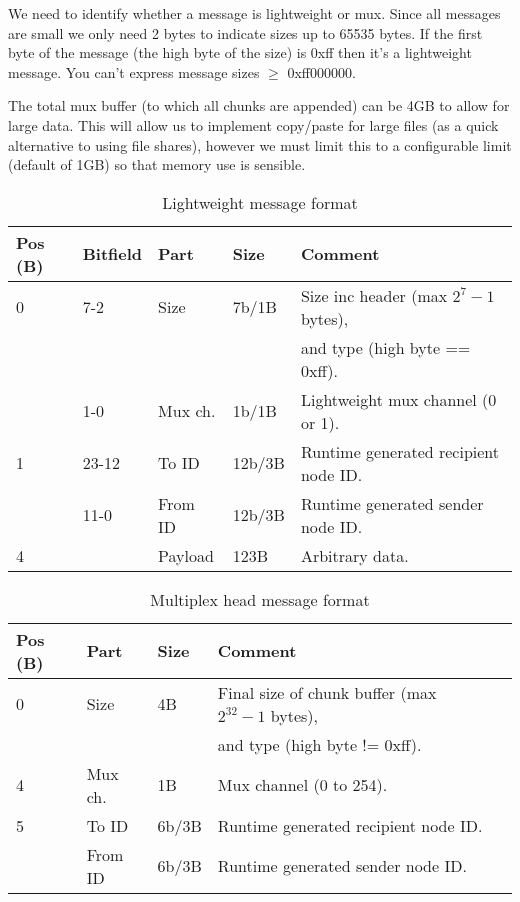 We need to identify whether a message is lightweight or mux. Since all
messages are small we only need 2 bytes to indicate sizes up to 65535 bytes.
If the first byte of the message (the high byte of the size) is 0xff then 
it's a lightweight message. You can't express message sizes $\geq$ 0xff000000.

The total mux buffer (to which all chunks are appended) can be 4GB to allow 
for large data. This will allow us to implement copy/paste for large files
(as a quick alternative to using file shares), however we must limit this
to a configurable limit (default of 1GB) so that memory use is sensible.

\begin{table}[ht!]
  \begin{tabular}{|l|l|l|l|l|}
    \hline
    \textbf{Pos (B)} &
    \textbf{Bitfield} &
    \textbf{Part} &
    \textbf{Size} &
    \textbf{Comment} \\
    \hline
    0 & 7-2 & Size & 7b/1B & Size inc header (max $2^7-1$ bytes), \\
      &     &      &       & and type (high byte == 0xff). \\
      & 1-0 & Mux ch. & 1b/1B & Lightweight mux channel (0 or 1). \\
    1 & 23-12 & To ID & 12b/3B & Runtime generated recipient node ID. \\
      & 11-0 & From ID & 12b/3B & Runtime generated sender node ID. \\
    4 & & Payload & 123B & Arbitrary data. \\
    \hline
  \end{tabular}
  \caption{Lightweight message format}
  \label{tab:lightMessage}
\end{table}

\begin{table}[ht!]
  \begin{tabular}{|l|l|l|l|l|}
    \hline
    \textbf{Pos (B)} &
    \textbf{Part} &
    \textbf{Size} &
    \textbf{Comment} \\
    \hline
    0 & Size & 4B & Final size of chunk buffer (max $2^{32}-1$ bytes), \\ 
      &      &    & and type (high byte != 0xff). \\
    4 & Mux ch. & 1B & Mux channel (0 to 254). \\
    5 & To ID & 6b/3B & Runtime generated recipient node ID. \\
      & From ID & 6b/3B & Runtime generated sender node ID. \\
    \hline
  \end{tabular}
  \caption{Multiplex head message format}
  \label{tab:muxHeadMessage}
\end{table}

